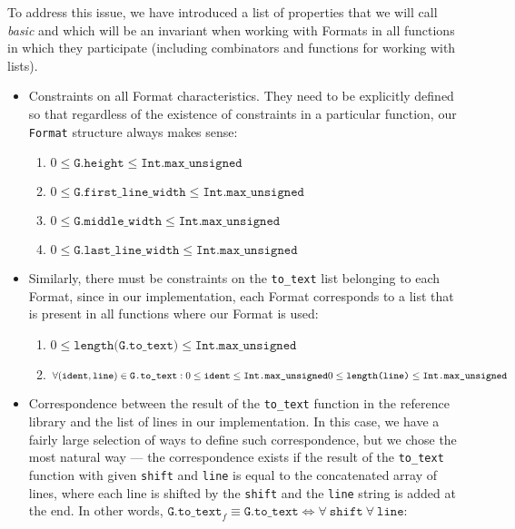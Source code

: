 \documentclass[14pt]{constructor-diploma}
\begin{document}
To address this issue, we have introduced a list of properties that we will call \textit{basic} and which will be an invariant when working with Formats in all functions in which they participate 
(including combinators and functions for working with lists).
\begin{itemize}
  \item Constraints on all Format characteristics. 
  They need to be explicitly defined so that regardless of the existence of constraints in a particular function, our \texttt{Format} structure always makes sense:
  \begin{enumerate}
    \item $0 \le \texttt{G.height} \le \texttt{Int.max\_unsigned}$
    \item $0 \le \texttt{G.first\_line\_width} \le \texttt{Int.max\_unsigned}$
    \item $0 \le \texttt{G.middle\_width} \le \texttt{Int.max\_unsigned}$
    \item $0 \le \texttt{G.last\_line\_width} \le \texttt{Int.max\_unsigned}$
  \end{enumerate}
  \item Similarly, there must be constraints on the \texttt{to\_text} list belonging to each Format, since in our implementation, 
  each Format corresponds to a list that is present in all functions where our Format is used:
  \begin{enumerate}
    \item $0 \le \texttt{length(G.to\_text)} \le \texttt{Int.max\_unsigned}$
    \item $\forall (\texttt{ident}, \texttt{line}) \in \texttt{G.to\_text}:\\ 0 \le \texttt{ident} \le \texttt{Int.max\_unsigned}\\ 0 \le \texttt{length(line)} \le \texttt{Int.max\_unsigned}$
  \end{enumerate}
  \item Correspondence between the result of the \texttt{to\_text} function in the reference library and the list of lines in our implementation. 
  In this case, we have a fairly large selection of ways to define such correspondence, but we chose the most natural way --- the correspondence exists 
  if the result of the \texttt{to\_text} function with given \texttt{shift} and \texttt{line} is equal to the concatenated array of lines, 
  where each line is shifted by the \texttt{shift} and the \texttt{line} string is added at the end.
  In other words, $\texttt{G.to\_text}_f \equiv \texttt{G.to\_text} \iff \forall~\texttt{shift}~\forall~\texttt{line}$:

\end{itemize}
\end{document}
